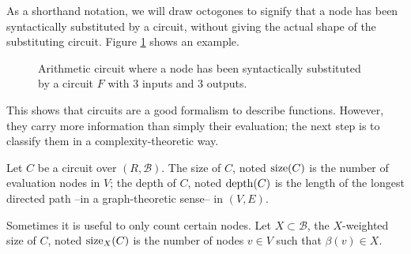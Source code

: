 As a shorthand notation, we will draw octogones to signify that a node
has been syntactically substituted by a circuit, without giving the
actual shape of the substituting circuit. Figure
\ref{fig:substitution} shows an example.

\begin{figure}[!ht]
  \label{fig:substitution}
  \centering
  \caption{Arithmetic circuit where a node has been syntactically
    substituted by a circuit $F$ with $3$ inputs and $3$ outputs.}
\end{figure}

This shows that circuits are a good formalism to describe
functions. However, they carry more information than simply their
evaluation; the next step is to classify them in a
complexity-theoretic way.

\begin{definition}
  \label{def:size}
  Let $C$ be a circuit over $(R,\mathcal{B})$. The size of $C$, noted
  $\operatorname{size}(C)$ is the number of evaluation nodes in $V$; the depth of
  $C$, noted $\operatorname{depth}(C)$ is the length of the longest directed path
  --in a graph-theoretic sense-- in $(V,E)$.

  Sometimes it is useful to only count certain nodes. Let
  $X\subset\mathcal{B}$, the $X$-weighted size of $C$, noted
  $\operatorname{size}_X(C)$ is the number of nodes $v\in V$ such that $\beta(v)\in
  X$.
\end{definition}


